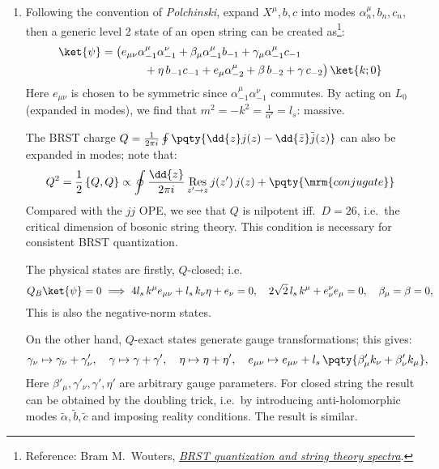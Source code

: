 \documentclass[a4paper,10pt]{article}
\begin{document}
\begin{enumerate}
\begin{enumerate}
	\item Following the convention of \textit{Polchinski}, expand $X^\mu,b,c$ into modes $\alpha^\mu_n,b_n,c_n$, then a generic level 2 state of an open string can be created as\footnote{
		Reference: Bram M.~Wouters, \href{https://esc.fnwi.uva.nl/thesis/centraal/files/f1989820784.pdf}{\textit{BRST quantization and string theory spectra}}. 
	}:
	\begin{equation}
	\begin{aligned}
		\ket{\psi} = \big(
			&e_{\mu\nu}
				\alpha^\mu_{-1}
				\alpha^\nu_{-1}
			+ \beta_\mu
				\alpha^\mu_{-1} b_{-1}
			+ \gamma_\mu
				\alpha^\mu_{-1} c_{-1}
			\\ &\qquad
			+ \eta\,b_{-1} c_{-1}
			+ e_\mu \alpha^\mu_{-2}
			+ \beta\,b_{-2}
			+ \gamma\,c_{-2}
		\big)\,\ket{k;0}
	\end{aligned}
	\end{equation}
	Here $e_{\mu\nu}$ is chosen to be symmetric since $
		\alpha^\mu_{-1}
		\alpha^\nu_{-1}
	$ commutes. 
	By acting on $L_0$ (expanded in modes), we find that $
		m^2 = -k^2 = \frac{1}{\alpha'} = l_s
	$: massive. 
	
	The BRST charge $
		Q = \frac{1}{2\pi i} \oint \pqty{
			\dd{z} j(z)
			- \dd{\bar{z}} \tilde{j}(z)
		}
	$ can also be expanded in modes; note that:
	\begin{equation}
		Q^2 = \frac{1}{2}\,\{Q,Q\}
		\propto \oint \frac{\dd{z}}{2\pi i} 
			\operatorname*{Res}\limits_{z'\to z}
			j(z')\,j(z) + \pqty{\mrm{conjugate}}
	\end{equation}
	Compared with the $jj$ OPE, we see that $Q$ is nilpotent iff.\ $D = 26$, i.e.\ the critical dimension of bosonic string theory. This condition is necessary for consistent BRST quantization. 
	
	The physical states are firstly, $Q$-closed; i.e.
	\begin{equation}
		Q_B \ket{\psi} = 0
		\ \Longrightarrow\ %
		4l_s\,k^\mu e_{\mu\nu}
			+ l_s\,k_\nu\eta
			+ e_\nu = 0,\quad
		2\sqrt{2}\,l_s\,k^\mu
			+ e^\nu_\nu e_\mu = 0,\quad
		\beta_\mu = \beta = 0,
	\end{equation}
	This is also the negative-norm states. 
	
	On the other hand, $Q$-exact states generate gauge transformations; this gives:
	\begin{equation}
		\gamma_\nu
		\mapsto \gamma_\nu
			+ \gamma'_\nu,\quad
		\gamma
		\mapsto \gamma
			+ \gamma',\quad
		\eta
		\mapsto \eta + \eta',\quad
		e_{\mu\nu}
		\mapsto e_{\mu\nu} + l_s\,\pqty{
			\beta'_\mu k_\nu
			+ \beta'_\nu k_\mu
		},
	\end{equation}
	Here $
		\beta'_\mu,\gamma'_\nu,\gamma',\eta'
	$ are arbitrary gauge parameters. For closed string the result can be obtained by the doubling trick, i.e.\ by introducing anti-holomorphic modes $\tilde{\alpha},\tilde{b},\tilde{c}$ and imposing reality conditions. The result is similar. \qedfull
	

\end{enumerate}
\end{enumerate}
\end{document}
